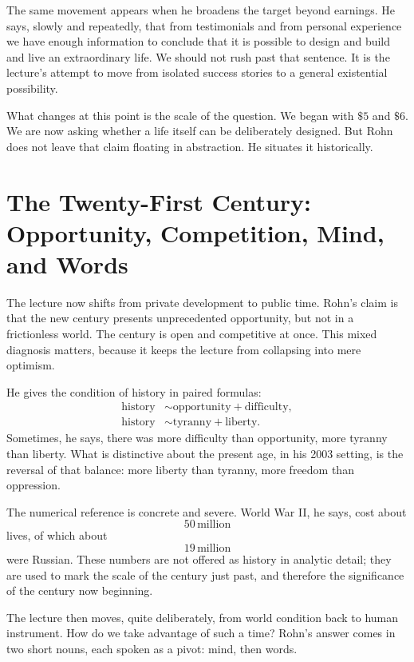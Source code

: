 The same movement appears when he broadens the target beyond earnings. He says, slowly and repeatedly, that from testimonials and from personal experience we have enough information to conclude that it is possible to design and build and live an extraordinary life. We should not rush past that sentence. It is the lecture's attempt to move from isolated success stories to a general existential possibility.

What changes at this point is the scale of the question. We began with \(\$5\) and \(\$6\). We are now asking whether a life itself can be deliberately designed. But Rohn does not leave that claim floating in abstraction. He situates it historically.

\section{The Twenty-First Century: Opportunity, Competition, Mind, and Words}

The lecture now shifts from private development to public time. Rohn's claim is that the new century presents unprecedented opportunity, but not in a frictionless world. The century is open and competitive at once. This mixed diagnosis matters, because it keeps the lecture from collapsing into mere optimism.

He gives the condition of history in paired formulas:
\begin{align}
\text{history} &\sim \text{opportunity} + \text{difficulty}, \\
\text{history} &\sim \text{tyranny} + \text{liberty}.
\end{align}
Sometimes, he says, there was more difficulty than opportunity, more tyranny than liberty. What is distinctive about the present age, in his 2003 setting, is the reversal of that balance: more liberty than tyranny, more freedom than oppression.

The numerical reference is concrete and severe. World War II, he says, cost about
\begin{equation}
50\,\text{million}
\end{equation}
lives, of which about
\begin{equation}
19\,\text{million}
\end{equation}
were Russian. These numbers are not offered as history in analytic detail; they are used to mark the scale of the century just past, and therefore the significance of the century now beginning.

The lecture then moves, quite deliberately, from world condition back to human instrument. How do we take advantage of such a time? Rohn's answer comes in two short nouns, each spoken as a pivot: mind, then words.

